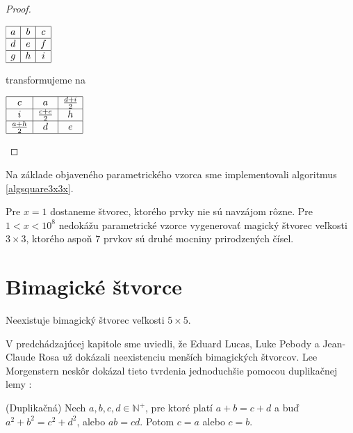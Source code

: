 \begin{proof}
\begin{center}
$\begin{array}{ |c|c|c| } 
\hline
a & b & c \\ 
\hline
d & e & f \\ 
\hline
g & h & i \\
\hline
\end{array}$
\end{center}

transformujeme na

\begin{center}
$\begin{array}{ |c|c|c| } 
\hline
c & a & \frac{d+i}{2} \\ 
\hline
i & \frac{c+e}{2} & h \\ 
\hline
\frac{a+h}{2} & d & e \\
\hline
\end{array}$
\end{center}
\end{proof}

Na základe objaveného parametrického vzorca sme implementovali algoritmus \ref{algsquare3x3x}.

\begin{result} Pre $x = 1$ dostaneme štvorec, ktorého prvky nie sú navzájom rôzne. Pre $1 < x < 10^8$ nedokážu parametrické vzorce vygenerovať magický štvorec veľkosti $3 \times 3$, ktorého aspoň $7$ prvkov sú druhé mocniny prirodzených čísel.
\end{result}

\section{Bimagické štvorce}

\begin{hypothesis} Neexistuje bimagický štvorec veľkosti $5 \times 5$.
\end{hypothesis}

V predchádzajúcej kapitole sme uviedli, že Eduard Lucas, Luke Pebody a Jean-Claude Rosa už dokázali neexistenciu menších bimagických štvorcov. Lee Morgenstern neskôr dokázal tieto tvrdenia jednoduchšie pomocou duplikačnej lemy \cite{multimagie}:

\begin{lemma} (Duplikačná) Nech $a,b,c,d \in \mathbb{N^+}$, pre ktoré platí $a + b = c + d$ a buď $a^2 + b^2 = c^2 + d^2$, alebo $ab = cd$. Potom $c = a$ alebo $c = b$.
\end{lemma}
 
